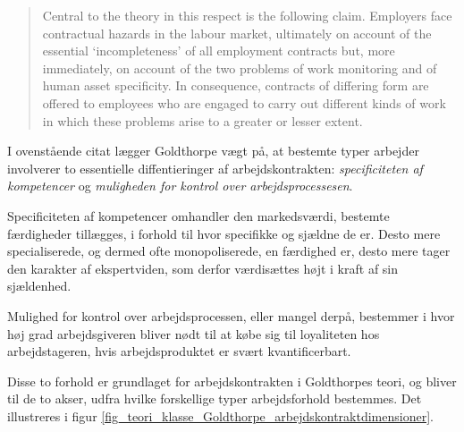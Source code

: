 %
\begin{quote} \small %
Central to the theory in this respect is the following claim. Employers face contractual hazards in the labour market, ultimately on account of the essential ‘incompleteness’ of all employment contracts but, more immediately, on account of the two problems of work monitoring and of human asset specificity. In consequence, contracts of differing form are offered to employees who are engaged to carry out different kinds of work in which these problems arise to a greater or lesser extent.  
\end{quote}
%

I ovenstående citat lægger Goldthorpe vægt på, at bestemte typer arbejder involverer to essentielle diffentieringer af arbejdskontrakten:  \emph{specificiteten af kompetencer} og \emph{muligheden for kontrol over arbejdsprocessesen}. 

Specificiteten af kompetencer omhandler den markedsværdi, bestemte færdigheder tillægges, i forhold til hvor specifikke og sjældne de er. Desto mere specialiserede, og dermed ofte monopoliserede, en færdighed er, desto mere tager den karakter af ekspertviden, som derfor værdisættes højt i kraft af sin sjældenhed. 

Mulighed for kontrol over arbejdsprocessen, eller mangel derpå, bestemmer i hvor høj grad arbejdsgiveren bliver nødt til at købe sig til loyaliteten hos arbejdstageren, hvis arbejdsproduktet er svært kvantificerbart.

Disse to forhold er grundlaget for arbejdskontrakten i Goldthorpes teori, og bliver til de to akser, udfra hvilke forskellige typer arbejdsforhold bestemmes. Det illustreres i figur \ref{fig_teori_klasse_Goldthorpe_arbejdskontraktdimensioner}. 

